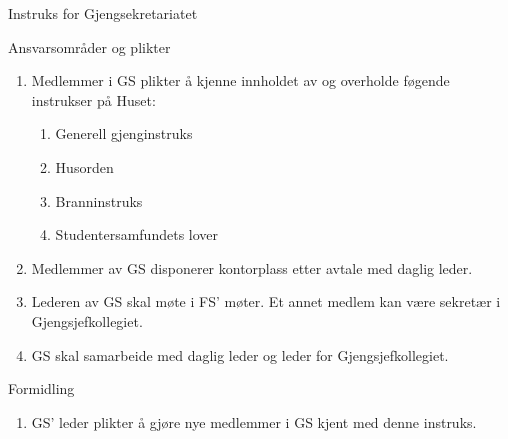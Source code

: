 \begin{instruks}{Instruks for Gjengsekretariatet}{}{}
    \begin{instruksledd}{Ansvarsområder og plikter}
        \begin{enumerate}
            \item Medlemmer i GS plikter å kjenne innholdet av og overholde
	    føgende instrukser på Huset:
                \begin{enumerate}
                    \item Generell gjenginstruks
                    \item Husorden
                    \item Branninstruks
                    \item Studentersamfundets lover
                \end{enumerate}
            \item Medlemmer av GS disponerer kontorplass etter avtale med daglig leder.
            \item Lederen av GS skal møte i FS' møter. Et annet medlem kan være sekretær i
Gjengsjefkollegiet.
            \item GS skal samarbeide med daglig leder og leder for Gjengsjefkollegiet.
        \end{enumerate}
    \end{instruksledd}

    \begin{instruksledd}{Formidling}
        \begin{enumerate}
            \item GS' leder plikter å gjøre nye medlemmer i GS kjent med denne instruks.
        \end{enumerate}
    \end{instruksledd}


\end{instruks}
